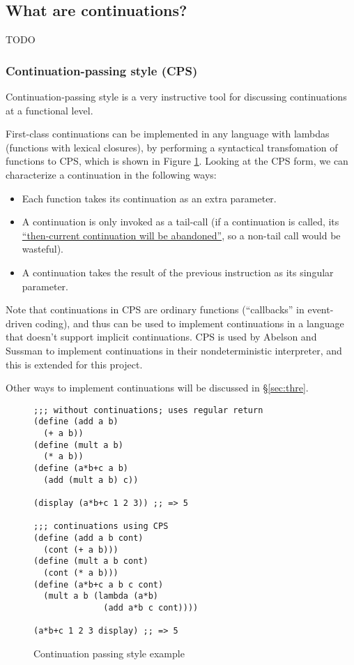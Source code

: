 \documentclass[]{article}
\begin{document}
\subsection{What are continuations?}
\label{sec:what}

TODO

\subsubsection{Continuation-passing style (CPS)}
\label{sec:cps}

Continuation-passing style is a very instructive tool for discussing continuations at a functional level.

First-class continuations can be implemented in any language with lambdas (functions with lexical closures), by performing a syntactical transfomation of functions to CPS, which is shown in Figure \ref{fig:cps}. Looking at the CPS form, we can characterize a continuation in the following ways:
\begin{itemize}
\item Each function takes its continuation as an extra parameter.
\item A continuation is only invoked as a tail-call (if a continuation is called, its \href{https://wiki.c2.com/?CallWithCurrentContinuation}{``then-current continuation will be abandoned''}, so a non-tail call would be wasteful).
\item A continuation takes the result of the previous instruction as its singular parameter.
\end{itemize}

Note that continuations in CPS are ordinary functions (``callbacks'' in event-driven coding), and thus can be used to implement continuations in a language that doesn't support implicit continuations. CPS is used by Abelson and Sussman to implement continuations in their nondeterministic interpreter, and this is extended for this project.

Other ways to implement continuations will be discussed in \S{\ref{sec:thre}}.

\begin{figure}[h]
  \centering
\begin{verbatim}
;;; without continuations; uses regular return
(define (add a b)
  (+ a b))
(define (mult a b)
  (* a b))
(define (a*b+c a b)
  (add (mult a b) c))

(display (a*b+c 1 2 3)) ;; => 5

;;; continuations using CPS
(define (add a b cont)
  (cont (+ a b)))
(define (mult a b cont)
  (cont (* a b)))
(define (a*b+c a b c cont)
  (mult a b (lambda (a*b)
              (add a*b c cont))))

(a*b+c 1 2 3 display) ;; => 5
\end{verbatim}
  \caption{Continuation passing style example}
  \label{fig:cps}
\end{figure}
\end{document}
